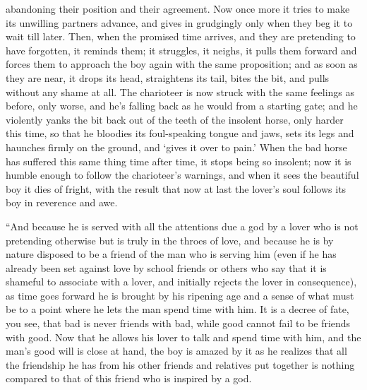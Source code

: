abandoning their position and their agreement. Now once more it
tries to make its unwilling partners advance, and gives in grudgingly
only when they beg it to wait till later. Then, when the promised time
arrives, and they are pretending to have forgotten, it reminds them; it
struggles, it neighs, it pulls them forward and forces them to approach
the boy again with the same proposition; and as soon as they are near,
it drops its head, straightens its tail, bites the bit, and pulls
without any shame at all. The charioteer is now struck with the same 
feelings as before, only worse, and he's falling back as he
would from a starting gate; and he violently yanks the bit back out of
the teeth of the insolent horse, only harder this time, so that he
bloodies its foul-speaking tongue and jaws, sets its legs and haunches
firmly on the ground, and ‘gives it over to
pain.' When the bad
horse has suffered this same thing time after time, it stops being so
insolent; now it is humble enough to follow the charioteer's warnings,
and when it sees the beautiful boy it dies of fright, with the result
that now at last the lover's soul follows its boy in reverence and awe.

“And because he is served with all the attentions due a
god by a lover who is not pretending otherwise but is truly in the
throes of love, and because he is by nature disposed to be a friend of
the man who is serving him (even if he has already been set against love
by school friends or others who say that it is shameful to associate
with a lover, and initially rejects the lover in consequence), as time
goes forward he is brought by his ripening age and a sense of
what must be to a point where he lets the man spend time with him. It is
a decree of fate, you see, that bad is never friends with bad, while
good cannot fail to be friends with good. Now that he allows his lover
to talk and spend time with him, and the man's good will is close at
hand, the boy is amazed by it as he realizes that all the friendship he
has from his other friends and relatives put together is nothing
compared to that of this friend who is inspired by a god.

